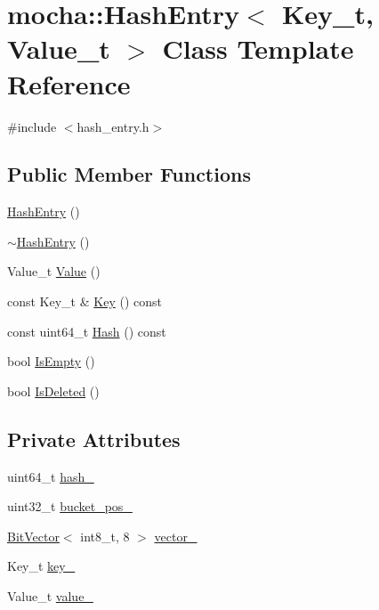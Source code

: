 \hypertarget{classmocha_1_1_hash_entry}{
\section{mocha::HashEntry$<$ Key\_\-t, Value\_\-t $>$ Class Template Reference}
\label{classmocha_1_1_hash_entry}
}


{\ttfamily \#include $<$hash\_\-entry.h$>$}

\subsection*{Public Member Functions}
\begin{DoxyCompactItemize}
\item 
\hyperlink{classmocha_1_1_hash_entry_a6fc91352d430fdb11569d2083fc58ec4}{HashEntry} ()
\item 
\hyperlink{classmocha_1_1_hash_entry_a9f89f442497df910a411a8ba8f72e162}{$\sim$HashEntry} ()
\item 
Value\_\-t \hyperlink{classmocha_1_1_hash_entry_a072df9202d93f0ad124b572e3e5cb342}{Value} ()
\item 
const Key\_\-t \& \hyperlink{classmocha_1_1_hash_entry_a28af9581b2817ce6a369319264720d48}{Key} () const 
\item 
const uint64\_\-t \hyperlink{classmocha_1_1_hash_entry_a909951ec0fe8195fb1c968a20913036e}{Hash} () const 
\item 
bool \hyperlink{classmocha_1_1_hash_entry_a5df8b8425354e736332e9d4a513ab87a}{IsEmpty} ()
\item 
bool \hyperlink{classmocha_1_1_hash_entry_a72153c174a29da9763980cbf657b00cc}{IsDeleted} ()
\end{DoxyCompactItemize}
\subsection*{Private Attributes}
\begin{DoxyCompactItemize}
\item 
uint64\_\-t \hyperlink{classmocha_1_1_hash_entry_a0d1b2dc5badc8eb2695c7cebbab6f9a5}{hash\_\-}
\item 
uint32\_\-t \hyperlink{classmocha_1_1_hash_entry_aaab82e5749291b8bda08fcdcca08e11c}{bucket\_\-pos\_\-}
\item 
\hyperlink{classmocha_1_1_bit_vector}{BitVector}$<$ int8\_\-t, 8 $>$ \hyperlink{classmocha_1_1_hash_entry_a474320a042bce9ced27c742951f5db9b}{vector\_\-}
\item 
Key\_\-t \hyperlink{classmocha_1_1_hash_entry_a08cc73b09fbd834a37811cb0edb40624}{key\_\-}
\item 
Value\_\-t \hyperlink{classmocha_1_1_hash_entry_a0334d07ef9c957ca8d3fb4b75219e13c}{value\_\-}
\end{DoxyCompactItemize}
